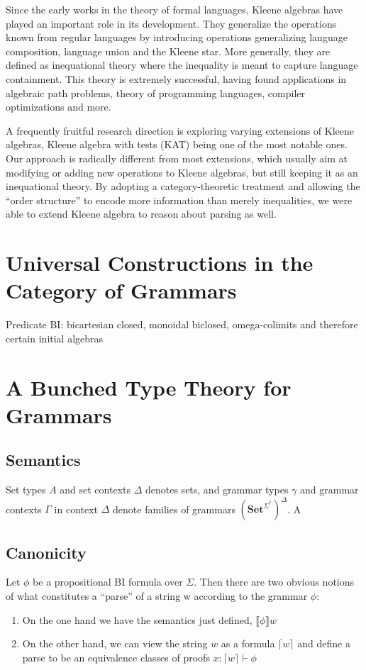 \documentclass[sigconf,anonymous,review,screen]{acmart}
\newcommand{\Set}{\mathbf{Set}}
\begin{document}
Since the early works in the theory of formal languages, Kleene
algebras have played an important role in its development. They
generalize the operations known from regular languages by introducing
operations generalizing language composition, language union and the
Kleene star.  More generally, they are defined as inequational theory
where the inequality is meant to capture language containment. This
theory is extremely successful, having found applications in algebraic
path problems, theory of programming languages, compiler optimizations
and more.

A frequently fruitful research direction is exploring varying
extensions of Kleene algebras, Kleene algebra with tests (KAT) being
one of the most notable ones. Our approach is radically different from
most extensions, which usually aim at modifying or adding new
operations to Kleene algebras, but still keeping it as an inequational
theory. By adopting a category-theoretic treatment and allowing the
``order structure'' to encode more information than merely
inequalities, we were able to extend Kleene algebra to reason about
parsing as well.

\section{Universal Constructions in the Category of Grammars}

Predicate BI: bicartesian closed, monoidal biclosed, omega-colimits
and therefore certain initial algebras



\section{A Bunched Type Theory for Grammars}


\subsection{Semantics}

Set types $A$ and set contexts $\Delta$ denotes sets, and
grammar types $\gamma$ and grammar contexts $\Gamma$ in context
$\Delta$ denote families of grammars $(\Set^{\Sigma^*})^\Delta$.  A

\subsection{Canonicity}

Let $\phi$ be a propositional BI formula over $\Sigma$. Then there are
two obvious notions of what constitutes a ``parse'' of a string w
according to the grammar $\phi$:
\begin{enumerate}
\item On the one hand we have the semantics just defined, $\llbracket \phi \rrbracket w$
\item On the other hand, we can view the string $w$ as a formula
  $\lceil w \rceil$ and define a parse to be an equivalence classes of
  proofs $x:\lceil w \rceil \vdash \phi$
\end{enumerate}
\end{document}
